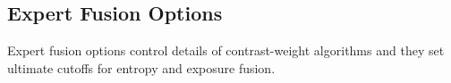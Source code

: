 

\newcommand*{\metalowercutoff}{\metavar{LOWER\hyp{}CUT\shyp OFF}}
\newcommand*{\metauppercutoff}{\metavar{UP\shyp PER\hyp{}CUT\shyp OFF}}
\newcommand*{\metalowerprojector}{\metavar{LOWER\hyp{}PRO\shyp JEC\shyp TOR}}
\newcommand*{\metaupperprojector}{\metavar{UP\shyp PER\hyp{}PRO\shyp
    JEC\shyp TOR}}



\subsection[Expert Fusion Options]{\label{sec:expert-fusion-options}%
  Expert Fusion Options}

Expert fusion options control details of contrast-weight algorithms and they set ultimate
cutoffs for entropy and exposure fusion.

